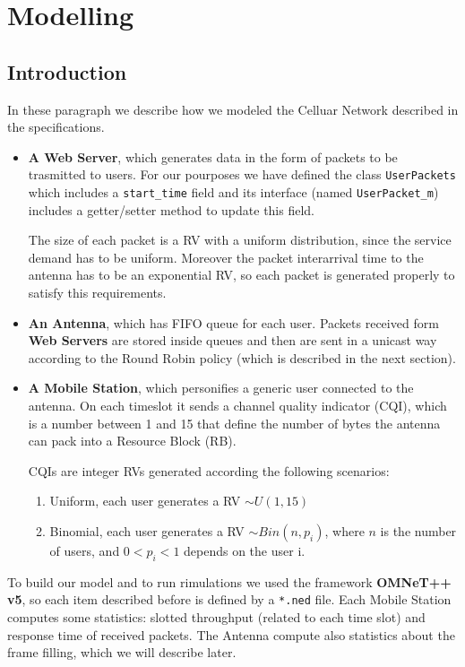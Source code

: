 \chapter{Modelling}
\section{Introduction}
In these paragraph we describe how we modeled the Celluar Network described in the specifications.
\begin{itemize}
   \item \textbf{A Web Server}, which generates data in the form of packets to be trasmitted to users. For our pourposes we have defined the class \texttt{UserPackets} which includes a \texttt{start\_time} field and its interface (named \texttt{UserPacket\_m}) includes a getter/setter method to update this field.
   
   The size of each packet is a RV with a uniform distribution, since the service demand has to be uniform. Moreover the packet interarrival time to the antenna has to be an exponential RV, so each packet is generated properly to satisfy this requirements.

   \item \textbf{An Antenna}, which has FIFO queue for each user. Packets received form \textbf{Web Servers} are stored inside queues and then are sent in a unicast way according to the Round Robin policy (which is described in the next section). 
   
   \item \textbf{A Mobile Station}, which personifies a generic user connected to the antenna. On each timeslot it sends a channel quality indicator (CQI), which is a number between 1 and 15 that define the number of bytes the antenna can pack into a Resource Block (RB).
   
   CQIs are integer RVs generated according the following scenarios:
   
   \begin{enumerate} 
    \item Uniform, each user generates a RV \(\sim U(1,15)\)
    \item Binomial, each user generates a RV \(\sim Bin(n,p_i)\), where \(n\) is the number of users, and \( 0<p_i<1\) depends on the user i.
    \end{enumerate} 
\end{itemize}

To build our model and to run rimulations we used the framework \textbf{OMNeT++ v5}, so each item described before is defined by a \texttt{*.ned} file.
Each Mobile Station computes some statistics: slotted throughput (related to each time slot) and response time of received packets. The Antenna compute also statistics about the frame filling, which we will describe later.

